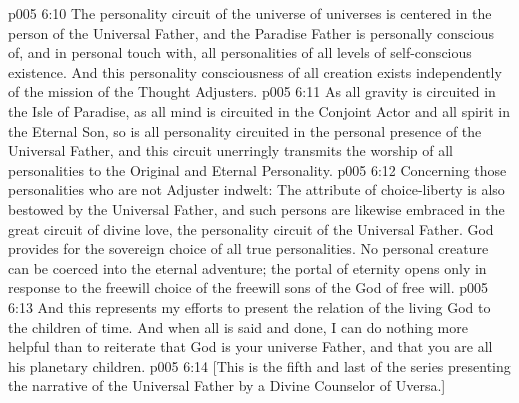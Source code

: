 \pc \vs p005 6:10 The personality circuit of the universe of universes is centered in the person of the Universal Father, and the Paradise Father is personally conscious of, and in personal touch with, all personalities of all levels of self\hyp{}conscious existence. And this personality consciousness of all creation exists independently of the mission of the Thought Adjusters.
\pc \vs p005 6:11 As all gravity is circuited in the Isle of Paradise, as all mind is circuited in the Conjoint Actor and all spirit in the Eternal Son, so is all personality circuited in the personal presence of the Universal Father, and this circuit unerringly transmits the worship of all personalities to the Original and Eternal Personality.
\pc \vs p005 6:12 Concerning those personalities who are not Adjuster indwelt: The attribute of choice\hyp{}liberty is also bestowed by the Universal Father, and such persons are likewise embraced in the great circuit of divine love, the personality circuit of the Universal Father. God provides for the sovereign choice of all true personalities. No personal creature can be coerced into the eternal adventure; the portal of eternity opens only in response to the freewill choice of the freewill sons of the God of free will.
\pc \vs p005 6:13 And this represents my efforts to present the relation of the living God to the children of time. And when all is said and done, I can do nothing more helpful than to reiterate that God is your universe Father, and that you are all his planetary children.
\vsetoff
\vs p005 6:14 [This is the fifth and last of the series presenting the narrative of the Universal Father by a Divine Counselor of Uversa.]
